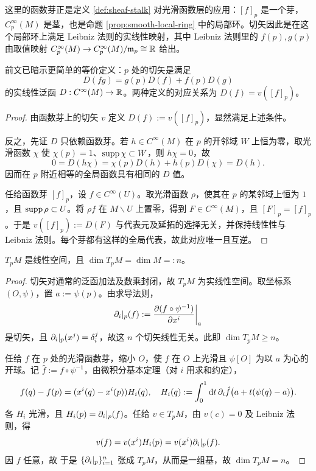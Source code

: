 \begin{remark}\label{rem:sheaf-stalk}
    这里的函数芽正是定义 \ref{def:sheaf-stalk} 对光滑函数层的应用：$[f]_p$ 是一个芽，$C^\infty_p(M)$ 是茎，也是命题 \ref{prop:smooth-local-ring} 中的局部环。切矢因此是在这个局部环上满足 Leibniz 法则的实线性映射，其中 Leibniz 法则里的 $f(p),g(p)$ 由取值映射 $C^\infty_p(M)\to C^\infty_p(M)/\mathfrak m_p\cong\mathbb{R}$ 给出。
\end{remark}

\begin{theorem}
    前文已暗示更简单的等价定义：$p$ 处的切矢是满足
    \[
        D(fg)=g(p)D(f)+f(p)D(g)
    \]
    的实线性泛函 $D:C^\infty(M)\to\mathbb{R}$。两种定义的对应关系为 $D(f)=v([f]_p)$。
\end{theorem}
\begin{proof}
    由函数芽上的切矢 $v$ 定义 $D(f):=v([f]_p)$，显然满足上述条件。

    反之，先证 $D$ 只依赖函数芽。若 $h\in C^\infty(M)$ 在 $p$ 的开邻域 $W$ 上恒为零，取光滑函数 $\chi$ 使 $\chi(p)=1$、$\operatorname{supp}\chi\subset W$，则 $h\chi=0$，故
    \[
        0=D(h\chi)=\chi(p)D(h)+h(p)D(\chi)=D(h).
    \]
    因而在 $p$ 附近相等的全局函数具有相同的 $D$ 值。

    任给函数芽 $[f]_p$，设 $f\in C^\infty(U)$。取光滑函数 $\rho$，使其在 $p$ 的某邻域上恒为 $1$，且 $\operatorname{supp}\rho\subset U$。将 $\rho f$ 在 $M\backslash U$ 上置零，得到 $F\in C^\infty(M)$，且 $[F]_p=[f]_p$。于是 $v([f]_p):=D(F)$ 与代表元及延拓的选择无关，并保持线性性与 Leibniz 法则。每个芽都有这样的全局代表，故此对应唯一且互逆。
\end{proof}

\begin{theorem}
    $T_p M$ 是线性空间，且 $\dim T_p M=\dim M =: n$。
\end{theorem}
\begin{proof}
    切矢对通常的泛函加法及数乘封闭，故 $T_p M$ 为实线性空间。取坐标系 $(O,\psi)$，置 $a:=\psi(p)$。由求导法则，
    \[
        \partial_i|_p(f):=\pdv{(f\circ\psi^{-1})}{x^i}\bigg|_a
    \]
    是切矢，且 $\partial_i|_p(x^j)=\delta_i^j$，故这 $n$ 个切矢线性无关。此即 $\dim T_p M\geqslant n$。

    任给 $f$ 在 $p$ 处的光滑函数芽，缩小 $O$，使 $f$ 在 $O$ 上光滑且 $\psi[O]$ 为以 $a$ 为心的开球。记 $\hat f:=f\circ\psi^{-1}$，由微积分基本定理（对 $i$ 用求和约定），
    \[
        f(q)-f(p)= (x^i(q)-x^i(p))H_i(q),\quad
        H_i(q):=\int_0^1\dd{t}\partial_i\hat f\bigl(a+t(\psi(q)-a)\bigr).
    \]
    各 $H_i$ 光滑，且 $H_i(p)=\partial_i|_p(f)$。任给 $v\in T_p M$，由 $v(c)=0$ 及 Leibniz 法则，得
    \[
        v(f)= v(x^i)H_i(p)= v(x^i)\partial_i|_p(f).
    \]
    因 $f$ 任意，故
    于是 $\{\partial_i|_p\}_{i=1}^n$ 张成 $T_p M$，从而是一组基，故 $\dim T_p M=n$。
\end{proof}

